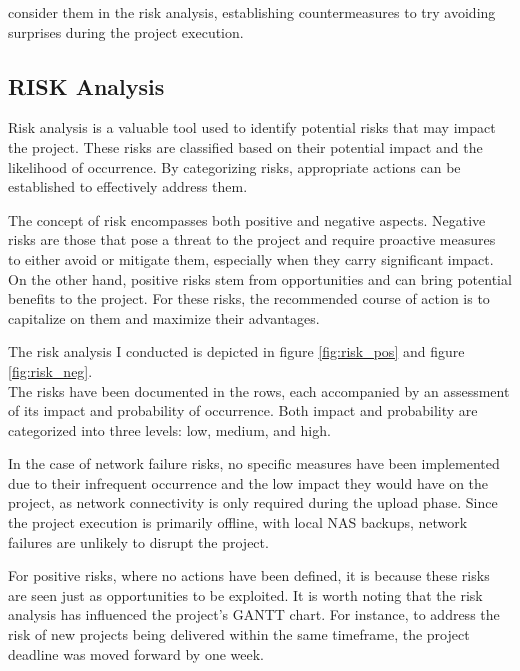 \documentclass{article}
\begin{document}
\begin{multicols}{2}
    \noindent
    consider them in the risk analysis, establishing countermeasures to try avoiding surprises during the project execution.

    \subsection{RISK Analysis}
    Risk analysis is a valuable tool used to identify potential risks that may impact the project. These risks are classified based on their potential impact and the 
    likelihood of occurrence. By categorizing risks, appropriate actions can be established to effectively address them.

    The concept of risk encompasses both positive and negative aspects. Negative risks are those that pose a threat to the project and require proactive measures to 
    either avoid or mitigate them, especially when they carry significant impact. On the other hand, positive risks stem from opportunities and can bring potential 
    benefits to the project. For these risks, the recommended course of action is to capitalize on them and maximize their advantages.

    The risk analysis I conducted is depicted in figure \ref{fig:risk_pos} and figure \ref{fig:risk_neg}.\\
    \noindent
    The risks have been documented in the rows, each accompanied by an assessment of its impact and probability of occurrence. Both impact and probability are 
    categorized into three levels: low, medium, and high. \\
    \clearpage

    In the case of network failure risks, no specific measures have been implemented due to their infrequent 
    occurrence and the low impact they would have on the project, as network connectivity is only required during the upload phase. Since the project execution is 
    primarily offline, with local NAS backups, network failures are unlikely to disrupt the project.

    For positive risks, where no actions have been defined, it is because these risks are seen just as opportunities to be exploited. It is worth noting 
    that the risk analysis has influenced the project's GANTT chart. For instance, to address the risk of new projects being delivered within the same timeframe, 
    the project deadline was moved forward by one week.



\end{multicols}
\end{document}
